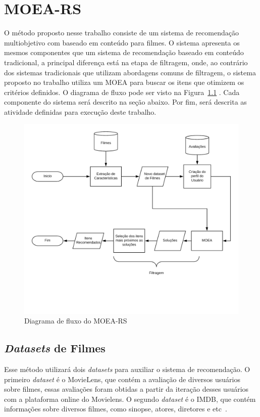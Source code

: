 \chapter{MOEA-RS}
O método proposto nesse trabalho consiste de um sistema de recomendação multiobjetivo com baseado em conteúdo para filmes. O sistema apresenta os mesmos componentes que um sistema de recomendação baseado em conteúdo tradicional, a principal diferença está na etapa de filtragem, onde, ao contrário dos sistemas tradicionais que utilizam abordagens comuns de filtragem, o sistema proposto no trabalho utiliza um MOEA para buscar os itens que otimizem os critérios definidos. O diagrama de fluxo pode ser visto na Figura~\ref{fig:fluxo} . Cada componente do sistema será descrito na seção abaixo. Por fim, será descrita as atividade definidas para execução deste trabalho.
\begin{figure}[h!]
   
    \centering
    \includegraphics[width=14cm]{Imagens/algoritmo_fluxo.png}
   \caption{Diagrama de fluxo do MOEA-RS}
    \label{fig:fluxo}
    
\end{figure}

\section{\textit{Datasets} de Filmes}
Esse método utilizará dois \textit{datasets} para auxiliar o sistema de recomendação. O primeiro \textit{dataset} é o MovieLens\cite{harper2016movielens}, que contém a avaliação de diversos usuários sobre filmes, essas avaliações foram obtidas a partir da iteração desses usuários com a plataforma online do Movielens. O segundo \textit{dataset} é o IMDB, que contém informações sobre diversos filmes, como sinopse, atores, diretores e etc~\cite{imdb}. 

